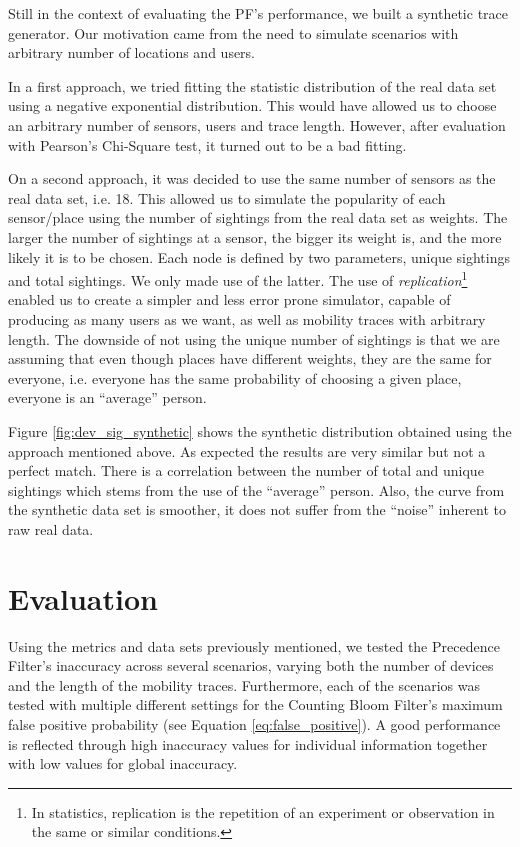 Still in the context of evaluating the PF's performance, we built a
synthetic trace generator. Our motivation came from the need to
simulate scenarios with arbitrary number of locations and users.

In a first approach, we tried fitting the statistic distribution of
the real data set using a negative exponential distribution. This
would have allowed us to choose an arbitrary number of sensors, users
and trace length. However, after evaluation with Pearson's Chi-Square
test, it turned out to be a bad fitting. 

On a second approach, it was decided to use the same number of sensors
as the real data set, i.e. 18. This allowed us to simulate the
popularity of each sensor/place using the number of sightings from the
real data set as weights. The larger the number of sightings at a
sensor, the bigger its weight is, and the more likely it is to be
chosen. Each node is defined by two parameters, unique sightings and
total sightings. We only made use of the latter. The use of
\emph{replication}\footnote{In statistics, replication is the
  repetition of an experiment or observation in the same or similar
  conditions.} enabled us to create  a simpler and less error prone
simulator, capable of producing as many users as we want, as well as
mobility traces with arbitrary length.  The downside of not using the
unique number of sightings is that we are assuming that even though
places have different weights, they are the same for everyone,
i.e. everyone has the same probability of choosing a given place,
everyone is an ``average'' person.

Figure \ref{fig:dev_sig_synthetic} shows the synthetic distribution
obtained using the approach mentioned above.  As expected the results
are very similar but not a perfect match. There is a
correlation between the number of total and unique sightings which
stems from the use of the ``average'' person. Also, the curve from the
synthetic data set is smoother, it does not suffer from the
``noise'' inherent to raw real data.

\section{Evaluation}
\label{sec:ct-evaluation}

Using the metrics and data sets previously mentioned, we tested the
Precedence Filter's inaccuracy across several scenarios, varying both
the number of devices and the length of the mobility traces.
Furthermore, each of the scenarios was tested with multiple different
settings for the Counting Bloom Filter's maximum false positive
probability (see Equation \ref{eq:false_positive}).
A good performance is reflected through high inaccuracy values for
individual information together with low values for global inaccuracy.

